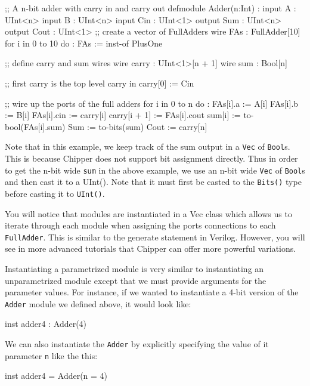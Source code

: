 \begin{stanza}
;; A n-bit adder with carry in and carry out
defmodule Adder(n:Int) :
  input  A    : UInt<n>
  input  B    : UInt<n>
  input  Cin  : UInt<1>
  output Sum  : UInt<n>
  output Cout : UInt<1>
  ;; create a vector of FullAdders
  wire FAs : FullAdder[10]
  for i in 0 to 10 do :
    FAs := inst-of PlusOne

  ;; define carry and sum wires
  wire carry : UInt<1>[n + 1]
  wire sum   : Bool[n]

  ;; first carry is the top level carry in
  carry[0] := Cin

  ;; wire up the ports of the full adders
  for i in 0 to n do :
     FAs[i].a     := A[i]
     FAs[i].b     := B[i]
     FAs[i].cin   := carry[i]
     carry[i + 1] := FAs[i].cout
     sum[i]       := to-bool(FAs[i].sum)
  Sum  := to-bits(sum)
  Cout := carry[n]
\end{stanza}

Note that in this example, we keep track of the sum output in a \verb+Vec+ of \verb+Bool+s. This is because Chipper does not support bit assignment directly. Thus in order to get the n-bit wide \verb+sum+ in the above example, we use an n-bit wide \verb+Vec+ of \verb+Bool+s and then cast it to a UInt(). Note that it must first be casted to the \verb+Bits()+ type before casting it to \verb+UInt()+.

You will notice that modules are instantiated in a Vec class which allows us to iterate through each module when assigning the ports connections to each \verb+FullAdder+. This is similar to the generate statement in Verilog. However, you will see in more advanced tutorials that Chipper can offer more powerful variations.

Instantiating a parametrized module is very similar to instantiating an unparametrized module except that we must provide arguments for the parameter values. For instance, if we wanted to instantiate a 4-bit version of the \verb+Adder+ module we defined above, it would look like:

\begin{stanza}
inst adder4 : Adder(4)
\end{stanza}

We can also instantiate the \verb+Adder+ by explicitly specifying the value of it parameter \verb+n+ like the this:

\begin{stanza}
inst adder4 = Adder(n = 4)
\end{stanza}

